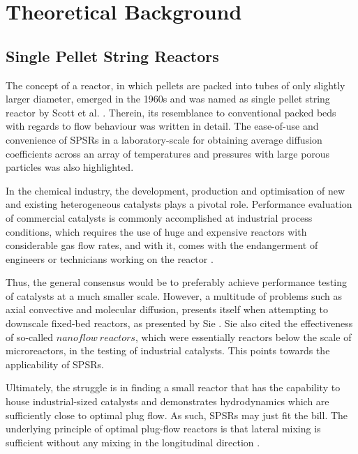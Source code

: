 \chapter{Theoretical Background}
\label{ch:02_Theoretical_Background}
\section{Single Pellet String Reactors}
The concept of a reactor, in which pellets are packed into tubes of only slightly larger diameter, emerged in the 1960s and was named as single pellet string reactor by Scott et al. \cite{Scott1974}. Therein, its resemblance to conventional packed beds with regards to flow behaviour was written in detail. The ease-of-use and convenience of SPSRs in a laboratory-scale for obtaining average diffusion coefficients across an array of temperatures and pressures with large porous particles was also highlighted.

In the chemical industry, the development, production and optimisation of new and existing heterogeneous catalysts plays a pivotal role. Performance evaluation of commercial catalysts is commonly accomplished at industrial process conditions, which requires the use of huge and expensive reactors with considerable gas flow rates, and with it, comes with the endangerment of engineers or technicians working on the reactor \cite{Heinemann1994}.

Thus, the general consensus would be to preferably achieve performance testing of catalysts at a much smaller scale. However, a multitude of problems such as axial convective and molecular diffusion, presents itself when attempting to downscale fixed-bed reactors, as presented by Sie \cite{Sie1996}. Sie also cited the effectiveness of so-called $nanoflow\:reactors$, which were essentially reactors below the scale of microreactors, in the testing of industrial catalysts. This points towards the applicability of SPSRs.

Ultimately, the struggle is in finding a small reactor that has the capability to house industrial-sized catalysts and demonstrates hydrodynamics which are sufficiently close to optimal plug flow. As such, SPSRs may just fit the bill. The underlying principle of optimal plug-flow reactors is that lateral mixing is sufficient without any mixing in the longitudinal direction \cite{San1989}.



